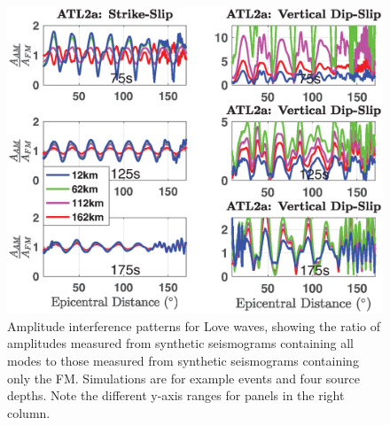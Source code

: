 \documentclass[extra,mreferee]{gji}
\begin{document}
\begin{figure}
\includegraphics[width=1\textwidth]{Fig4_LargerYAxes.eps}
\caption{Amplitude interference patterns for Love waves, showing the ratio of amplitudes measured from synthetic seismograms containing all modes to those measured from synthetic seismograms containing only the FM. Simulations are for example events and four source depths. Note the different y-axis ranges for panels in the right column.}
\end{figure}
 
\end{document}
